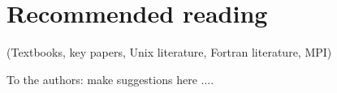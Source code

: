 \chapter{Recommended reading}
\label{appendix_recommended_reading}

(Textbooks, key papers, Unix literature, Fortran literature, MPI)

To the authors: make suggestions here .... 